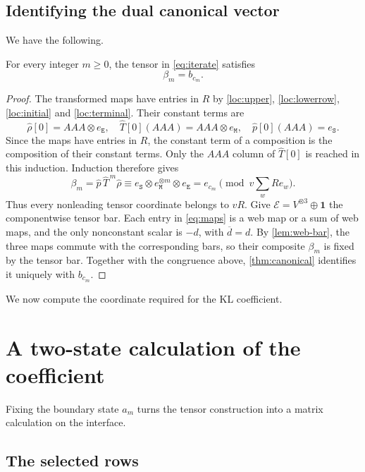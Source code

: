 \documentclass[a4paper,11pt]{amsart}
\newcommand{\one}{\mathbf1}
\newcommand{\wordstart}{\mathtt{S}}
\newcommand{\wordmiddle}{\mathtt{M}}
\newcommand{\wordend}{\mathtt{E}}
\newcommand{\tpar}{v}
\numberwithin{equation}{subsection}
\theoremstyle{plain}
\theoremstyle{definition}
\theoremstyle{remark}
\begin{document}
\subsection{Identifying the dual canonical vector}

We have the following.

\begin{lemma}\label{prop:canonical}
For every integer $m\ge0$, the tensor in \autoref{eq:iterate} satisfies
\[
\beta_m=b_{c_m}.
\]
\end{lemma}

\begin{proof}
The transformed maps have entries in $R$ by
\autoref{loc:upper}, \autoref{loc:lowerrow}, \autoref{loc:initial}
and \autoref{loc:terminal}. Their constant terms are
\[
\widehat\rho[0]=AAA\otimes e_{\wordend},\quad
\widehat T[0](AAA)=AAA\otimes e_{\wordmiddle},\quad
\widehat p[0](AAA)=e_{\wordstart}.
\]
Since the maps have entries in $R$, the constant term of a
composition is the composition of their constant terms.
Only the $AAA$ column of $\widehat T[0]$ is reached in this
induction. Induction therefore gives
\[
\beta_m=\widehat p\,\widehat T^{\,m}\widehat\rho
\equiv e_{\wordstart}\otimes e_{\wordmiddle}^{\otimes m}\otimes e_{\wordend}
=e_{c_m}\pmod {\tpar\sum_w R e_w}.
\]
Thus every nonleading tensor coordinate belongs to $\tpar R$.
Give $\mathcal E=V^{\otimes3}\oplus\one$ the componentwise
tensor bar. Each entry in \autoref{eq:maps} is a web map or a sum of
web maps, and the only nonconstant scalar is $-d$, with
$\overline d=d$. By \autoref{lem:web-bar}, the three maps commute
with the corresponding bars, so their composite $\beta_m$ is fixed
by the tensor bar. Together with the congruence above,
\autoref{thm:canonical} identifies it uniquely with $b_{c_m}$.
\end{proof}

We now compute the coordinate required for the KL coefficient.

\section{A two-state calculation of the coefficient}\label{sec:readout}

Fixing the boundary state $a_m$ turns the tensor construction into
a matrix calculation on the interface.

\subsection{The selected rows}
\end{document}
